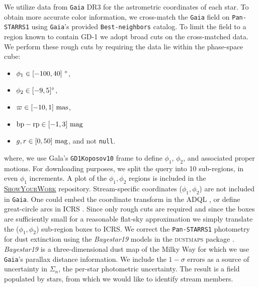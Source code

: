\documentclass[twocolumn]{aastex631}
\newcommand{\package}[1]{\textsc{#1}}
\newcommand{\dataarchive}[1]{\texttt{#1}}
\newcommand{\Gaia}{\dataarchive{Gaia}}
\newcommand{\PanStarrs}{\dataarchive{Pan-STARRS1}}
\begin{document}
        We utilize data from \Gaia{} DR3 for the astrometric coordinates of
        each star. 
        To obtain more accurate color information, we cross-match the \Gaia{}
        field on \PanStarrs{} \citep{PanSTARRS1} using 
        \Gaia's provided \texttt{Best-neighbors} catalog.
        To limit the field to a region known to contain GD-1 we adopt broad cuts
        on the cross-matched data. We perform these rough cuts by requiring
        the data lie within the phase-space cube:
        \begin{itemize}
            \item $\phi_1 \in [-100, 40] \ \rm{\degree}$,
            \item $\phi_2 \in [-9, 5] \rm{\degree}$,
            \item $\varpi \in [-10, 1] \ \rm{mas}$,
            \item $\rm{bp-rp} \in [-1, 3] \ \rm{mag}$
            \item $g, r \in [0, 50] \ \rm{mag}$, and not \texttt{null}.
        \end{itemize}
        where, we use Gala's \citep{gala, galav1.3} \texttt{GD1Koposov10} frame
        \citep{Koposov+2010} to define $\phi_1$, $\phi_2$, and associated proper motions.
        For downloading purposes, we split the query into 10 sub-regions,
        in even $\phi_1$ increments. A plot of the $\phi_1, \phi_2$ regions is included
        in the \href{\GitHubURL{}}{\package{ShowYourWork}} repository.
        Stream-specific coordinates ($\phi_1, \phi_2$) are not included in \Gaia.
        One could embed the coordinate transform in the ADQL \citep{ADQL2.0},
        or define great-circle arcs in ICRS \citep{ICRS1997}. Since only rough
        cuts are required and since the boxes are sufficiently small for a reasonable flat-sky
        approximation  we simply translate the ($\phi_1, \phi_2$) sub-region boxes to ICRS.
        We correct the \PanStarrs{} photometry for dust extinction
        using the \textit{Bayestar19} \citep{Green+2019} models in the \package{dustmaps} package \citep{Green2018}.
        \textit{Bayestar19} is a three-dimensional dust map of the Milky Way
        for which we use \Gaia's parallax distance information.
        We include the $1-\sigma$ errors as a source of uncertainty
        in $\Sigma_n$, the per-star photometric uncertainty.
        The result is a field populated by  stars,
        from which we would like to identify stream members.
\end{document}
